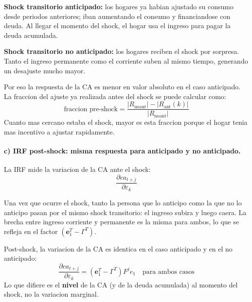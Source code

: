 \textbf{Shock transitorio anticipado:} los hogares ya habian ajustado su consumo desde periodos anteriores; iban aumentando el consumo y financiandose con deuda. Al llegar el momento del shock, el hogar usa el ingreso para pagar la deuda acumulada.

\textbf{Shock transitorio no anticipado:} los hogares reciben el shock por sorpresa. Tanto el ingreso permanente como el corriente suben al mismo tiempo, generando un desajuste mucho mayor.

Por eso la respuesta de la CA es menor en valor absoluto en el caso anticipado. La fraccion del ajuste ya realizada antes del shock se puede calcular como:
\[
    \text{fraccion pre-shock} = \frac{|R_{\text{noant}}| - |R_{\text{ant}}(k)|}{|R_{\text{noant}}|}
\]
Cuanto mas cercano estaba el shock, mayor es esta fraccion porque el hogar tenia mas incentivo a ajustar rapidamente.

\paragraph{c) IRF post-shock: misma respuesta para anticipado y no anticipado.}

La IRF mide la variacion de la CA ante el shock:
\[
    \frac{\partial ca_{t+j}}{\partial \varepsilon_k}
\]

Una vez que ocurre el shock, tanto la persona que lo anticipo como la que no lo anticipo pasan por el mismo shock transitorio: el ingreso subira y luego caera. La brecha entre ingreso corriente y permanente es la misma para ambos, lo que se refleja en el factor $(\mathbf{e}_1^T - \Gamma^T)$.

\begin{resultado}
Post-shock, la variacion de la CA es identica en el caso anticipado y en el no anticipado:
\[
    \frac{\partial ca_{t+j}}{\partial \varepsilon_k} = (\mathbf{e}_1^T - \Gamma^T) F^j e_1 \quad \text{para ambos casos}
\]
Lo que difiere es el \textbf{nivel} de la CA (y de la deuda acumulada) al momento del shock, no la variacion marginal.
\end{resultado}
